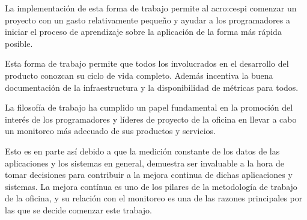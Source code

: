 La implementación de esta forma de trabajo permite al \gls{acro:cespi} comenzar
un proyecto con un gasto relativamente pequeño y ayudar a los programadores a
iniciar el proceso de aprendizaje sobre la aplicación de la forma más rápida
posible\cite[p~.2]{lean:the_lean_startup}.

Esta forma de trabajo permite que todos los involucrados en el desarrollo del
producto conozcan su ciclo de vida completo. Además incentiva la buena
documentación de la infraestructura y la disponibilidad de métricas para todos.

La filosofía de trabajo ha cumplido un papel fundamental en la promoción del
interés de los programadores y líderes de proyecto de la oficina en llevar a
cabo un monitoreo más adecuado de sus productos y servicios.

Esto es en parte así debido a que la medición constante de los datos de las
aplicaciones y los sistemas en general, demuestra ser invaluable a la hora de
tomar decisiones para contribuir a la mejora continua de dichas aplicaciones y
sistemas. La mejora contínua es uno de los pilares de la metodología de trabajo
de la oficina, y su relación con el monitoreo es una de las razones principales
por las que se decide comenzar este trabajo.
